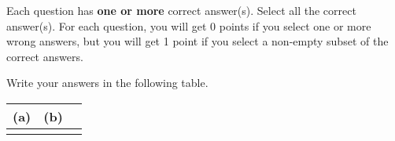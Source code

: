 
Each question has \textbf{one or more} correct answer(s). Select all the correct answer(s). For each question, you will get 0 points if you select one or more wrong answers, but you will get 1 point if you select a non-empty subset of the correct answers.

Write your answers in the following table.


\begin{table}[htbp]
    \centering
    \begin{tabular}{|p{2cm}|p{2cm}|p{2cm}|}
        \hline
        (a) & (b) \\
        \hline
          &     \\
        \hline
    \end{tabular}
\end{table}

